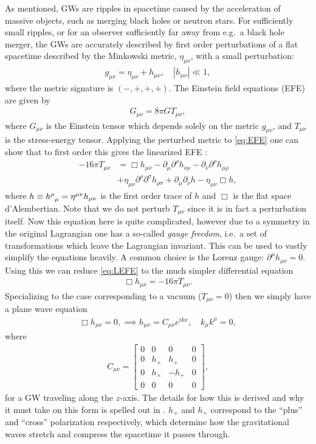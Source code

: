 \documentclass[%
reprint,
amsmath,amssymb,
aps,
]{revtex4-2}
\newcommand{\p}{\partial}
\begin{document}
As mentioned, GWs are ripples in spacetime caused by the acceleration of massive objects, such as merging black holes or neutron stars. For sufficiently small ripples, or for an observer sufficiently far away from e.g.~a black hole merger, the GWs are accurately described by first order perturbations of a flat spacetime described by the Minkowski metric, $\eta_{\mu\nu}$, with a small perturbation:
\begin{align}
	g_{\mu\nu}=\eta_{\mu\nu}+h_{\mu\nu},\quad|h_{\mu\nu}|\ll1,
\end{align}
where the metric signature is $(-,+,+,+)$. The Einstein field equations (EFE) are given by
\begin{align}
	G_{\mu\nu}=8\pi GT_{\mu\nu},
	\label{eq:EFE}
\end{align}
where $G_{\mu\nu}$ is the Einstein tensor which depends solely on the metric $g_{\mu\nu}$, and $T_{\mu\nu}$ is the stress-energy tensor. Applying the perturbed metric to \eqref{eq:EFE} one can show that to first order this gives the linearized EFE \cite{Carroll}:
\begin{align}
	-16\pi T_{\mu\nu}&=\Box h_{\mu\nu}-\p_\mu\p^\rho h_{\nu\rho}-\p_\nu\p^\rho h_{\mu\rho}\nonumber\\
	&+\eta_{\mu\nu}\p^\rho\p^\sigma h_{\rho\sigma}+\p_\mu \p_\nu h-\eta_{\mu\nu}\Box h,
	\label{eq:LEFE}
\end{align}
where $h\equiv \tensor{h}{^\mu_\mu}=\eta^{\mu\nu}h_{\mu\nu}$ is the first order trace of $h$ and $\Box$ is the flat space d'Alembertian. Note that we do not perturb $T_{\mu\nu}$ since it is in fact a perturbation itself. Now this equation here is quite complicated, however due to a symmetry in the original Lagrangian one has a so-called \textit{gauge freedom}, i.e.~a set of transformations which leave the Lagrangian invariant. This can be used to vastly simplify the equations heavily. A common choice is the Lorenz gauge: $\p^\mu h_{\mu\nu}=0$. Using this we can reduce \eqref{eq:LEFE} to the much simpler differential equation
\begin{align}
	\Box h_{\mu\nu}=-16\pi T_{\mu\nu}.
\end{align}
Specializing to the case corresponding to a vacuum ($T_{\mu\nu}=0$) then we simply have a plane wave equation
\begin{align}
	\Box h_{\mu\nu}=0,\implies h_{\mu\nu}=C_{\mu\nu}e^{ikx},\quad k_\mu k^\mu=0,
\end{align}
where
\begin{align}
	C_{\mu\nu}=\begin{bmatrix}
		0&0&0&0\\
		0&h_+&h_\times&0\\
		0&h_\times&-h_+&0\\
		0&0&0&0
	\end{bmatrix},
\end{align}
for a GW traveling along the $z$-axis. The details for how this is derived and why it must take on this form is spelled out in \cite{Carroll}. $h_+$ and $h_\times$ correspond to the ``plus'' and ``cross'' polarization respectively, which determine how the gravitational waves stretch and compress the spacetime it passes through. 
\end{document}
